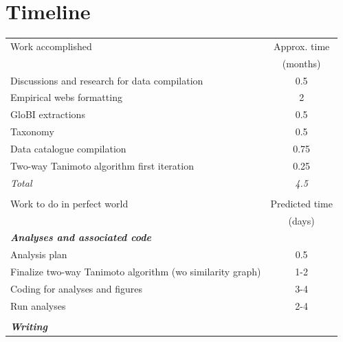 \documentclass[letterpaper]{article}
\begin{document}
\section{Timeline}
  \begin{table}[h!]
    \centering
    \begin{tabular}{l c}
      \hline
      Work accomplished                                           & Approx. time   \\
                                                                  & (months)    \\
      \hline
      Discussions and research for data compilation               & 0.5         \\
      Empirical webs formatting                                   & 2           \\
      GloBI extractions                                           & 0.5         \\
      Taxonomy                                                    & 0.5         \\
      Data catalogue compilation                                  & 0.75        \\
      Two-way Tanimoto algorithm first iteration                  & 0.25        \\
      \hline \hline
      \textit{Total}                                              & \textit{4.5}  \\
      \hline
      \\
      \hline
      Work to do in perfect world                                 & Predicted time    \\
                                                                  & (days)      \\
      \hline
      \textbf{\textit{Analyses and associated code}}                            \\
      Analysis plan                                               & 0.5         \\
      Finalize two-way Tanimoto algorithm (w\/o similarity graph) & 1-2         \\
      Coding for analyses and figures                             & 3-4         \\
      Run analyses                                                & 2-4         \\
      \\
      \textbf{\textit{Writing}}                                                 \\

\end{tabular}
\end{table}
\end{document}
